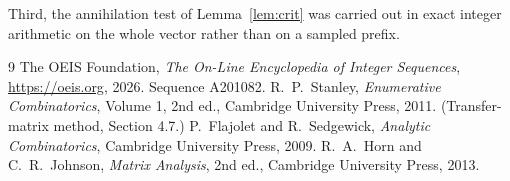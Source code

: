 \documentclass[11pt,a4paper]{article}
\theoremstyle{plain}
\theoremstyle{definition}
\begin{document}
Third, the annihilation test of Lemma~\ref{lem:crit} was carried out in exact integer
arithmetic on the whole vector rather than on a sampled prefix.

\begin{thebibliography}{9}
 The OEIS Foundation, \emph{The On-Line Encyclopedia of Integer
Sequences}, \url{https://oeis.org}, 2026. Sequence A201082.
 R.~P.~Stanley, \emph{Enumerative Combinatorics}, Volume 1, 2nd ed.,
Cambridge University Press, 2011. (Transfer-matrix method, Section 4.7.)
 P.~Flajolet and R.~Sedgewick, \emph{Analytic Combinatorics}, Cambridge
University Press, 2009.
 R.~A.~Horn and C.~R.~Johnson, \emph{Matrix Analysis}, 2nd ed., Cambridge
University Press, 2013.
\end{thebibliography}
\end{document}
